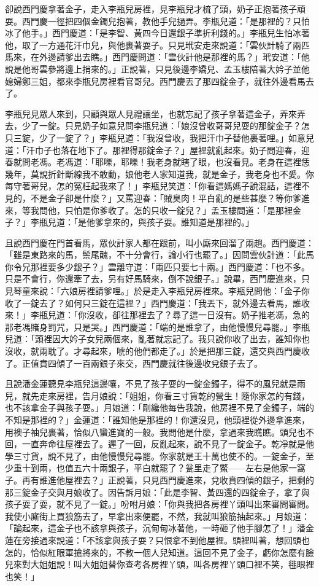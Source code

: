卻說西門慶拿著金子，走入李瓶兒房裡，見李瓶兒才梳了頭，奶子正抱著孩子頑耍。西門慶一徑把四個金鐲兒抱著，教他手兒撾弄。李瓶兒道：「是那裡的？只怕冰了他手。」西門慶道：「是李智、黃四今日還銀子準折利錢的。」李瓶兒生怕冰著他，取了一方通花汗巾兒，與他裹著耍子。只見玳安走來說道：「雲伙計騎了兩匹馬來，在外邊請爹出去瞧。」西門慶問道：「雲伙計他是那裡的馬？」玳安道：「他說是他哥雲參將邊上捎來的。」正說著，只見後邊李嬌兒、孟玉樓陪著大妗子並他媳婦鄭三姐，都來李瓶兒房裡看官哥兒。西門慶丟了那四錠金子，就往外邊看馬去了。

李瓶兒見眾人來到，只顧與眾人見禮讓坐，也就忘記了孩子拿著這金子，弄來弄去，少了一錠。只見奶子如意兒問李瓶兒道：「娘沒曾收哥哥兒耍的那錠金子？怎只三錠，少了一錠了？」李瓶兒道：「我沒曾收，我把汗巾子替他裹著哩。」如意兒道：「汗巾子也落在地下了。那裡得那錠金子？」屋裡就亂起來。奶子問迎春，迎春就問老馮。老馮道：「耶嚛，耶嚛！我老身就瞎了眼，也沒看見。老身在這裡恁幾年，莫說折針斷線我不敢動，娘他老人家知道我，就是金子，我老身也不愛。你每守著哥兒，怎的冤枉起我來了！」李瓶兒笑道：「你看這媽媽子說混話，這裡不見的，不是金子卻是什麼？」又罵迎春：「賊臭肉！平白亂的是些甚麼？等你爹進來，等我問他，只怕是你爹收了。怎的只收一錠兒？」孟玉樓問道：「是那裡金子？」李瓶兒道：「是他爹拿來的，與孩子耍。誰知道是那裡的。」

且說西門慶在門首看馬，眾伙計家人都在跟前，叫小廝來回溜了兩趟。西門慶道：「雖是東路來的馬，鬃尾醜，不十分會行，論小行也罷了。」因問雲伙計道：「此馬你令兄那裡要多少銀子？」雲離守道：「兩匹只要七十兩。」西門慶道：「也不多。只是不會行，你還牽了去，另有好馬騎來，倒不說銀子。」說畢，西門慶進來，只見琴童來說：「六娘房裡請爹哩。」於是走入李瓶兒房裡來。李瓶兒問他：「金子你收了一錠去了？如何只三錠在這裡？」西門慶道：「我丟下，就外邊去看馬，誰收來！」李瓶兒道：「你沒收，卻往那裡去了？尋了這一日沒有。奶子推老馮，急的那老馮賭身罰咒，只是哭。」西門慶道：「端的是誰拿了，由他慢慢兒尋罷。」李瓶兒道：「頭裡因大妗子女兒兩個來，亂著就忘記了。我只說你收了出去，誰知你也沒收，就兩耽了。才尋起來，唬的他們都走了。」於是把那三錠，還交與西門慶收了。正值賁四傾了一百兩銀子來交，西門慶就往後邊收兌銀子去了。

且說潘金蓮聽見李瓶兒這邊嚷，不見了孩子耍的一錠金鐲子，得不的風兒就是雨兒，就先走來房裡，告月娘說：「姐姐，你看三寸貨乾的營生！隨你家怎的有錢，也不該拿金子與孩子耍。」月娘道：「剛纔他每告我說，他房裡不見了金鐲子，端的不知是那裡的？」金蓮道：「誰知他是那裡的！你還沒見，他頭裡從外邊拿進來，用襖子袖兒裹著，恰似八蠻進寶的一般。我問他是什麼，拿過來我瞧瞧。頭兒也不回，一直奔命往屋裡去了。遲了一回，反亂起來，說不見了一錠金子。乾凈就是他學三寸貨，說不見了，由他慢慢兒尋罷。你家就是王十萬也使不的。一錠金子，至少重十到兩，也值五六十兩銀子，平白就罷了？瓮里走了鱉——左右是他家一窩子。再有誰進他屋裡去？」正說著，只見西門慶進來，兌收賁四傾的銀子，把剩的那三錠金子交與月娘收了。因告訴月娘：「此是李智、黃四還的四錠金子，拿了與孩子耍了耍，就不見了一錠。」吩咐月娘：「你與我把各房裡丫頭叫出來審問審問。我使小廝街上買狼筋去了，早拿出來便罷，不然，我就叫狼筋抽起來。」月娘道：「論起來，這金子也不該拿與孩子，沉甸甸冰著他，一時砸了他手腳怎了！」潘金蓮在旁接過來說道：「不該拿與孩子耍？只恨拿不到他屋裡。頭裡叫著，想回頭也怎的，恰似紅眼軍搶將來的，不教一個人兒知道。這回不見了金子，虧你怎麼有臉兒來對大姐姐說！叫大姐姐替你查考各房裡丫頭，叫各房裡丫頭口裡不笑，毴眼裡也笑！」

